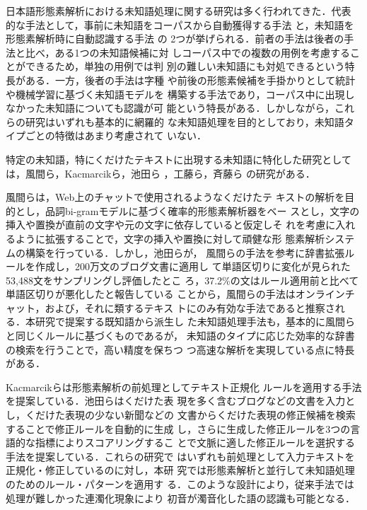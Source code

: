 \documentclass[japanese]{jnlp_1.4}
\begin{document}
  日本語形態素解析における未知語処理に関する研究は多く行われてきた．代表
  的な手法として，事前に未知語をコーパスから自動獲得する手法
  \cite{Mori1996s,Murawaki2008}と，未知語を形態素解析時に自動認識する手法
  \cite{Nagata1999,Uchimoto2001,Asahara2004c,Azuma2006,Nakagawa2007a}の
  2つが挙げられる．前者の手法は後者の手法と比べ，ある1つの未知語候補に対
  しコーパス中での複数の用例を考慮することができるため，単独の用例では判
  別の難しい未知語にも対処できるという特長がある．一方，後者の手法は字種
  や前後の形態素候補を手掛かりとして統計や機械学習に基づく未知語モデルを
  構築する手法であり，コーパス中に出現しなかった未知語についても認識が可
  能という特長がある．しかしながら，これらの研究はいずれも基本的に網羅的
  な未知語処理を目的としており，未知語タイプごとの特徴はあまり考慮されて
  いない．

  特定の未知語，特にくだけたテキストに出現する未知語に特化した研究として
  は，風間ら\cite{Kazama1999}，Kacmarcikら\cite{Kacmarcik2000}，池田ら
  \cite{Ikeda2010}，工藤ら\cite{Kudo2012}，斉藤ら
  \cite{Saito2013,Saito2014}の研究がある．

  風間ら\citeyear{Kazama1999}は，Web上のチャットで使用されるようなくだけたテ
  キストの解析を目的とし，品詞bi-gramモデルに基づく確率的形態素解析器をベー
  スとし，文字の挿入や置換が直前の文字や元の文字に依存していると仮定しそ
  れを考慮に入れるように拡張することで，文字の挿入や置換に対して頑健な形
  態素解析システムの構築を行っている．しかし，池田ら\citeyear{Ikeda2010}が，
  風間らの手法を参考に辞書拡張ルールを作成し，200万文のブログ文書に適用し
  て単語区切りに変化が見られた53,488文をサンプリングし評価したとこ
  ろ，37.2\%の文はルール適用前と比べて単語区切りが悪化したと報告している
  ことから，風間らの手法はオンラインチャット，および，それに類するテキス
  トにのみ有効な手法であると推察される．本研究で提案する既知語から派生し
  た未知語処理手法も，基本的に風間らと同じくルールに基づくものであるが，
  未知語のタイプに応じた効率的な辞書の検索を行うことで，高い精度を保ちつ
  つ高速な解析を実現している点に特長がある．

  Kacmarcikら\citeyear{Kacmarcik2000}は形態素解析の前処理としてテキスト正規化
  ルールを適用する手法を提案している．池田ら\citeyear{Ikeda2010}はくだけた表
  現を多く含むブログなどの文書を入力とし，くだけた表現の少ない新聞などの
  文書からくだけた表現の修正候補を検索することで修正ルールを自動的に生成
  し，さらに生成した修正ルールを3つの言語的な指標によりスコアリングするこ
  とで文脈に適した修正ルールを選択する手法を提案している．これらの研究で
  はいずれも前処理として入力テキストを正規化・修正しているのに対し，本研
  究では形態素解析と並行して未知語処理のためのルール・パターンを適用す
  る．このような設計により，従来手法では処理が難しかった連濁化現象により
  初音が濁音化した語の認識も可能となる．
\end{document}

